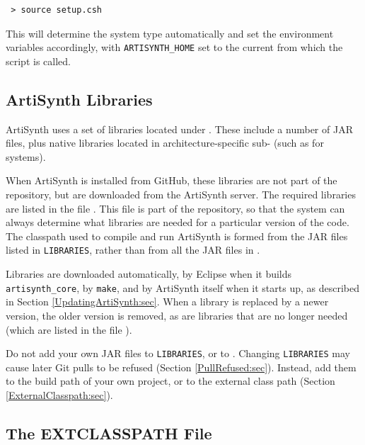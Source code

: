 \begin{verbatim}
 > source setup.csh
\end{verbatim}

This will determine the system type automatically and set the
environment variables accordingly, with {\tt ARTISYNTH\_HOME} set to the
current \directory{} from which the script is called.
\fi %

\subsection{ArtiSynth Libraries}
\label{ArtiSynthLibraries}

ArtiSynth uses a set of libraries located under
.  These include a number of JAR
files, plus native libraries located in architecture-specific
sub-\directories{} (such as {\tt \ARCH{}} for \FULLSYSTEM{} systems).

When ArtiSynth is installed from GitHub, these libraries are not part
of the repository, but are downloaded from the ArtiSynth server. The
required libraries are listed in the file . This file is part of the repository, so that the system
can always determine what libraries are needed for a particular
version of the code. The classpath used to compile and run ArtiSynth
is formed from the JAR files listed in {\tt LIBRARIES}, rather than
from all the JAR files in .

Libraries are downloaded automatically, by Eclipse when it builds {\tt
artisynth\_core}, by {\tt make}, and by ArtiSynth itself when it
starts up, as described in Section \ref{UpdatingArtiSynth:sec}. When a
library is replaced by a newer version, the older version is removed,
as are libraries that are no longer needed (which are listed in the
file ).

\begin{sideblock}
Do not add your own JAR files to {\tt LIBRARIES}, or to . Changing {\tt LIBRARIES} may cause later Git pulls to be refused
(Section \ref{PullRefused:sec}). Instead, add them to the build path of
your own project, or to the external class path
(Section \ref{ExternalClasspath:sec}).
\end{sideblock}

\subsection{The EXTCLASSPATH File}
\label{EXTCLASSPATHFile}

